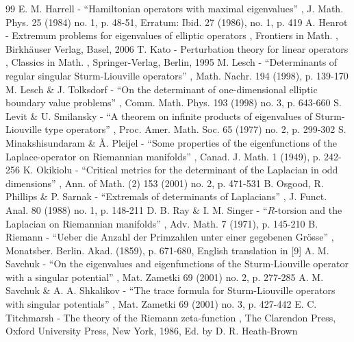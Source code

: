\documentclass[11pt]{article}
\begin{document}
\begin{thebibliography}{99}
 E. M. Harrell - “Hamiltonian operators with maximal eigenvalues” , J. Math. Phys. 25 (1984) no. 1, p. 48-51, Erratum: Ibid. 27 (1986), no. 1, p. 419
 A. Henrot - Extremum problems for eigenvalues of elliptic operators , Frontiers in Math. , Birkhäuser Verlag, Basel, 2006
 T. Kato - Perturbation theory for linear operators , Classics in Math. , Springer-Verlag, Berlin, 1995
 M. Lesch - “Determinants of regular singular Sturm-Liouville operators” , Math. Nachr. 194 (1998), p. 139-170
 M. Lesch \& J. Tolksdorf - “On the determinant of one-dimensional elliptic boundary value problems” , Comm. Math. Phys. 193 (1998) no. 3, p. 643-660
 S. Levit \& U. Smilansky - “A theorem on infinite products of eigenvalues of Sturm-Liouville type operators” , Proc. Amer. Math. Soc. 65 (1977) no. 2, p. 299-302
 S. Minakshisundaram \& Å. Pleijel - “Some properties of the eigenfunctions of the Laplace-operator on Riemannian manifolds” , Canad. J. Math. 1 (1949), p. 242-256
 K. Okikiolu - “Critical metrics for the determinant of the Laplacian in odd dimensions” , Ann. of Math. (2) 153 (2001) no. 2, p. 471-531
 B. Osgood, R. Phillips \& P. Sarnak - “Extremals of determinants of Laplacians” , J. Funct. Anal. 80 (1988) no. 1, p. 148-211
 D. B. Ray \& I. M. Singer - “$R$-torsion and the Laplacian on Riemannian manifolds” , Adv. Math. 7 (1971), p. 145-210
 B. Riemann - “Ueber die Anzahl der Primzahlen unter einer gegebenen Grösse” , Monatsber. Berlin. Akad. (1859), p. 671-680, English translation in [9]
 A. M. Savchuk - “On the eigenvalues and eigenfunctions of the Sturm-Liouville operator with a singular potential” , Mat. Zametki 69 (2001) no. 2, p. 277-285
 A. M. Savchuk \& A. A. Shkalikov - “The trace formula for Sturm-Liouville operators with singular potentials” , Mat. Zametki 69 (2001) no. 3, p. 427-442
 E. C. Titchmarsh - The theory of the Riemann zeta-function , The Clarendon Press, Oxford University Press, New York, 1986, Ed. by D. R. Heath-Brown
\end{thebibliography}
\end{document}
